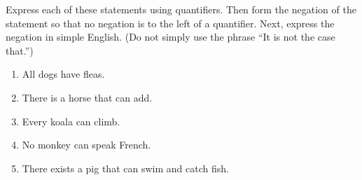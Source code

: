 \documentclass[b4paper,12pt,oneside,article]{memoir}
\begin{document}

\begin{tcolorbox}
	[colback=Emerald!10,colframe=cyan!40!black,title=\textbf{Question 32}]
	Express each of these statements using quantifiers. Then
	form the negation of the statement so that no negation is
	to the left of a quantifier. Next, express the negation in
	simple English. (Do not simply use the phrase ``It is not
	the case that.'')
	\begin{enumerate}[\bfseries a)]
		\item All dogs have fleas.
		\item There is a horse that can add.
		\item Every koala can climb.
		\item No monkey can speak French.
		\item There exists a pig that can swim and catch fish.
	\end{enumerate}
\end{tcolorbox}
\end{document}
